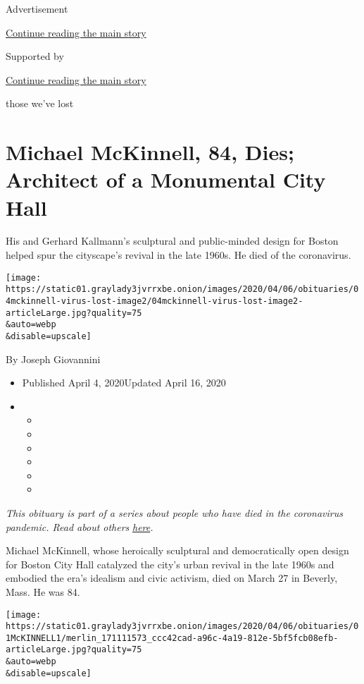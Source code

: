 Advertisement

\protect\hyperlink{after-top}{Continue reading the main story}

Supported by

\protect\hyperlink{after-sponsor}{Continue reading the main story}

those we've lost

\hypertarget{michael-mckinnell-84-dies-architect-of-a-monumental-city-hall}{%
\section{Michael McKinnell, 84, Dies; Architect of a Monumental City
Hall}\label{michael-mckinnell-84-dies-architect-of-a-monumental-city-hall}}

His and Gerhard Kallmann's sculptural and public-minded design for
Boston helped spur the cityscape's revival in the late 1960s. He died of
the coronavirus.

\texttt{[image: https://static01.graylady3jvrrxbe.onion/images/2020/04/06/obituaries/04mckinnell-virus-lost-image2/04mckinnell-virus-lost-image2-articleLarge.jpg?quality=75\\\&auto=webp\\\&disable=upscale]}

By Joseph Giovannini

\begin{itemize}
\item
  Published April 4, 2020Updated April 16, 2020
\item
  \begin{itemize}
  \item
  \item
  \item
  \item
  \item
  \item
  \end{itemize}
\end{itemize}

\emph{This obituary is part of a series about people who have died in
the coronavirus pandemic. Read about others}
\href{https://www.nytimes3xbfgragh.onion/series/people-who-have-died-of-the-coronavirus}{\emph{here}}\emph{.}

Michael McKinnell, whose heroically sculptural and democratically open
design for Boston City Hall catalyzed the city's urban revival in the
late 1960s and embodied the era's idealism and civic activism, died on
March 27 in Beverly, Mass. He was 84.

\texttt{[image: https://static01.graylady3jvrrxbe.onion/images/2020/04/06/obituaries/01McKINNELL1/merlin\_171111573\_ccc42cad-a96c-4a19-812e-5bf5fcb08efb-articleLarge.jpg?quality=75\\\&auto=webp\\\&disable=upscale]}

